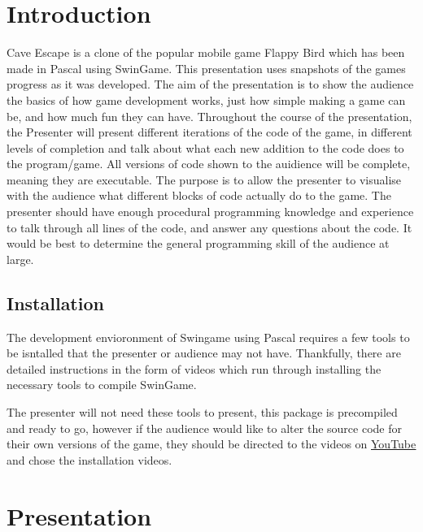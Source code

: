 \documentclass[12pt]{article}
\begin{document}
\section{Introduction}
Cave Escape is a clone of the popular mobile game Flappy Bird which has been made in
Pascal using SwinGame. This presentation uses snapshots of the games progress as it was developed.
\newline
\newline
The aim of the presentation is to show the audience the basics of how game development works, just how simple making
a game can be, and how much fun they can have.
\newline
\newline
Throughout the course of the presentation, the Presenter will present different iterations of the code of the game, in different levels of completion and
talk about what each new addition to the code does to the program/game.
\newline
\newline
All versions of code shown to the auidience will be complete, meaning they are executable. The purpose is to allow the presenter to visualise
with the audience what different blocks of code actually do to the game.
\newline
\newline
The presenter should have enough procedural programming knowledge and experience to talk through all lines of the code, and answer any questions about the code.
It would be best to determine the general programming skill of the audience at large.

\subsection{Installation}
The development envioronment of Swingame using Pascal requires a few tools to be isntalled that the presenter or audience
may not have. Thankfully, there are detailed instructions in the form of videos which run through installing the necessary tools to compile SwinGame.

The presenter will not need these tools to present, this package is precompiled and ready to go, however if the audience would like to alter the source code
for their own versions of the game, they should be directed to the videos on
\href{https://www.youtube.com/playlist?list=PLdVESrjTNUXtU8zclRh9ovhstzWQAY05U}{\underline{YouTube}} and chose the installation videos.
\pagebreak

\section{\Large\textbf{Presentation}}
\end{document}
